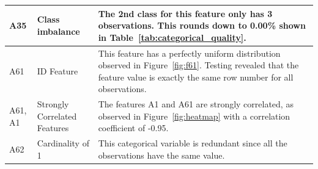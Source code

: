 \documentclass[11pt]{article}
\begin{document}
\begin{table}[H]
\begin{tabular}{|p{1.7cm}|l|p{8cm}|}
		\hline
		A35 & Class imbalance & The 2nd class for this feature only has 3 observations. This rounds down to 0.00\% shown in Table~\ref{tab:categorical_quality}. \\
		\hline
		A61 & ID Feature & This feature has a perfectly uniform distribution observed in Figure~\ref{fig:f61}. Testing revealed that the feature value is exactly the same row number for all observations. \\
		\hline
		A61, A1 & Strongly Correlated Features & The features A1 and A61 are strongly correlated, as observed in Figure~\ref{fig:heatmap} with a correlation coefficient of -0.95. \\
		\hline
		A62 & Cardinality of 1 & This categorical variable is redundant since all the observations have the same value. \\
		\hline
	\end{tabular}
\end{table}
\end{document}

